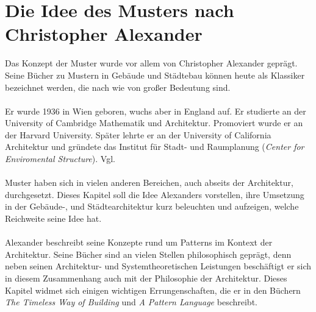 \documentclass[fontsize=11pt,a4paper,final]{scrreprt}[2003/01/01]
\begin{document}
\chapter{Die Idee des Musters nach Christopher Alexander}\label{Muster}
Das Konzept der Muster wurde vor allem von Christopher Alexander geprägt. Seine Bücher zu Mustern in Gebäude und Städtebau können heute als Klassiker bezeichnet werden, die nach wie von großer Bedeutung sind. \\ \\ 
Er wurde 1936 in Wien geboren, wuchs aber in England auf. Er studierte an der University of Cambridge Mathematik und Architektur. Promoviert wurde er an der Harvard University. Später lehrte er an der University of California Architektur und gründete das Institut für Stadt- und Raumplanung (\textit{Center for Enviromental Structure}). Vgl. \cite{ChristopherAlexanderWikiDe}\\ \\
Muster haben sich in vielen anderen Bereichen, auch abseits der Architektur, durchgesetzt. Dieses Kapitel soll die Idee Alexanders vorstellen, ihre Umsetzung in der Gebäude-, und Städtearchitektur kurz beleuchten und aufzeigen, welche Reichweite seine Idee hat. \\ \\
Alexander beschreibt seine Konzepte rund um Patterns im Kontext der Architektur. Seine Bücher sind an vielen Stellen philosophisch geprägt, denn neben seinen Architektur- und Systemtheoretischen Leistungen beschäftigt er sich in diesem Zusammenhang auch mit der Philosophie der Architektur. Dieses Kapitel widmet sich einigen wichtigen Errungenschaften, die er in den Büchern \textit{The Timeless Way of Building} \cite{Alexander1975} und \textit{A Pattern Language} \cite{Alexander1977} beschreibt. \\ \\
\end{document}
